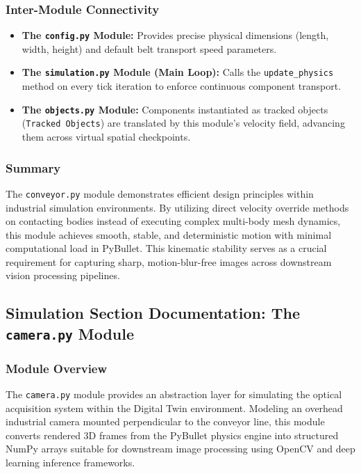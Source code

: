 \documentclass{article}
\begin{document}
\subsubsection{Inter-Module Connectivity}
\begin{itemize}
	\item \textbf{The \texttt{config.py} Module:} Provides precise physical dimensions (length, width, height) and default belt transport speed parameters.
	\item \textbf{The \texttt{simulation.py} Module (Main Loop):} Calls the \texttt{update\_physics} method on every tick iteration to enforce continuous component transport.
	\item \textbf{The \texttt{objects.py} Module:} Components instantiated as tracked objects (\texttt{Tracked Objects}) are translated by this module's velocity field, advancing them across virtual spatial checkpoints.
\end{itemize}

\subsubsection{Summary}
The \texttt{conveyor.py} module demonstrates efficient design principles within industrial simulation environments. By utilizing direct velocity override methods on contacting bodies instead of executing complex multi-body mesh dynamics, this module achieves smooth, stable, and deterministic motion with minimal computational load in PyBullet. This kinematic stability serves as a crucial requirement for capturing sharp, motion-blur-free images across downstream vision processing pipelines.


\subsection{Simulation Section Documentation: The \texttt{camera.py} Module}

\subsubsection{Module Overview}
The \texttt{camera.py} module provides an abstraction layer for simulating the optical acquisition system within the Digital Twin environment. Modeling an overhead industrial camera mounted perpendicular to the conveyor line, this module converts rendered 3D frames from the PyBullet physics engine into structured NumPy arrays suitable for downstream image processing using OpenCV and deep learning inference frameworks.
\end{document}
